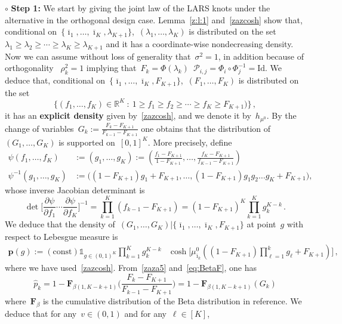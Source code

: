 \documentclass[final,numbib]{imaiai}%
\numberwithin{equation}{section}
\def\eq{\begin{equation}}
\def\qe{\end{equation}}
\def\cP{\mathcal{P}}
\def\bF{\boldsymbol{F}}
\def\bp{\mathbf{p}}
\def\bbR{\mathds{R}}
\renewcommand{\bar}{\overline}
\renewcommand{\hat}{\widehat}
\def\\bUnif{\text{\bUnif}}
\newcommand{\<}{\langle}
\renewcommand{\>}{\rangle}
\newcommand{\1}{\mathds{1}}
\begin{document}
{\noindent
 {$\circ$ \bf Step 1: }We start by giving the joint law of the LARS knots under the alternative in the orthogonal design case. Lemma~\ref{z:l:1} and~\eqref{zazcosh} show that, conditional on~$\{\bar \imath_1,\ldots, \bar \imath_K,\lambda_{K+1}\}$,~$(\lambda_1,\ldots,\lambda_K)$ is distributed on the set~$\lambda_1\geq \lambda_2\geq \cdots\geq \lambda_K\geq \lambda_{K+1}$ and it has a coordinate-wise nondecreasing density. 
 Now we can assume without loss of generality  that~$\sigma^2 =1$, in addition because of orthogonality 
~$\rho_k^2=1$ implying that~$F_k=\Phi(\lambda_k)$~$\cP_{i,j}=\Phi_i\circ\Phi_j^{-1}=\mathrm{Id}$.  We deduce that, conditional on~$\{\bar \imath_1,\ldots, \bar \imath_K,F_{K+1}\}$,~$(F_1,\ldots,F_K)$ is distributed on the set
\[
\big\{
(f_1,\ldots,f_K)\in\bbR^K\ :\ 
1\geq f_1\geq f_2\geq \cdots\geq f_K\geq F_{K+1})
\big\}\,,
\]
it has an {\bf explicit density} given by~\eqref{zazcosh}, and we denote it by~$h_{\mu^0}$. By the change of variables~$G_k:=\frac{ F_k-F_{K+1}}{ F_{k-1}-F_{K+1}}$ one  obtains that the distribution of~$(G_1,\ldots,G_K)$ is supported on~$[0,1]^K$. More precisely, define
\begin{align*}
\psi(f_1,\ldots,f_K)& :=(g_1,\ldots,g_K)   := (\frac{ f_1-F_{K+1}}{1-F_{K+1}},\ldots,\frac{ f_K-F_{K+1}}{f_{K-1}-F_{K+1}}) \\
\psi^{-1}(g_1,\ldots,g_K)&:=\Big((1-F_{K+1})g_1+F_{K+1},\ldots,(1-F_{K+1})g_1g_2\ldots g_K+F_{K+1}\Big),
\end{align*}
whose inverse Jacobian determinant is 
\[
\det\Big[\frac{\partial \psi}{\partial f_1} \cdots\frac{\partial \psi}{\partial f_K}\Big]^{-1}=\prod_{k=1}^K(f_{k-1}-F_{K+1})=(1-F_{K+1})^K\prod_{k=1}^{K}g_k^{K-k}\,.
\] 
We deduce that the density  of~$(G_1,\ldots,G_K)|\{\bar \imath_1,\ldots,\bar \imath_K,F_{K+1}\}$  at point~$g$ with respect to Lebesgue measure is 
\begin{align}
\label{eq:density}
\bp(g):=
\mathrm{(const)}\mathds 1_{g\in(0,1)^K}\prod_{k=1}^{K}g_k^{K-k}&\cosh\big[{\mu^0_{\bar\imath_k}}((1-F_{K+1})\prod_{\ell=1}^kg_\ell+F_{K+1})\big]\,,
\end{align}
where we have used~\eqref{zazcosh}. From~\eqref{zaza5} and~\eqref{eq:BetaF}, one has 
\eq
\label{eq:yoyoFDR}
\hat p_k =1-\bF_{\beta(1,K-k+1)} \bigg( \frac{ F_k-F_{K+1}}{ F_{k-1}-F_{K+1}} \bigg)
=1-\bF_{\beta(1,K-k+1)}(G_k)
\qe
 where~$\bF_\beta$ is the cumulative distribution  of the Beta distribution in reference. We deduce that for any~$v\in(0,1)$ and for any~$\ell\in[K]$, 
\begin{align*}

\end{align*}}
\end{document}

